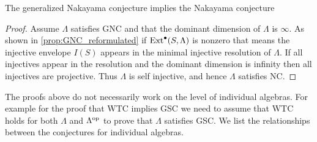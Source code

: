 %		
%		
%		
%		
%

\begin{prop}\cite{AR75} 
	The generalized Nakayama conjecture implies the Nakayama conjecture
	\begin{proof}
		Assume $\Lambda$ satisfies GNC and that the dominant dimension of $\Lambda$ is $\infty$. As shown in \cref{prop:GNC_reformulated} if $\operatorname{Ext}^\bullet(S, \Lambda)$ is nonzero that means the injective envelope $I(S)$ appears in the minimal injective resolution of $\Lambda$. If all injectives appear in the resolution and the dominant dimension is infinity then all injectives are projective. Thus $\Lambda$ is self injective, and hence $\Lambda$ satisfies NC. 
	\end{proof}
\end{prop}

The proofs above do not necessarily work on the level of individual algebras. For example for the proof that WTC implies GSC we need to assume that WTC holds for both $\Lambda$ and $\Lambda^{\operatorname{op}}$ to prove that $\Lambda$ satisfies GSC. We list the relationships between the conjectures for individual algebras.

